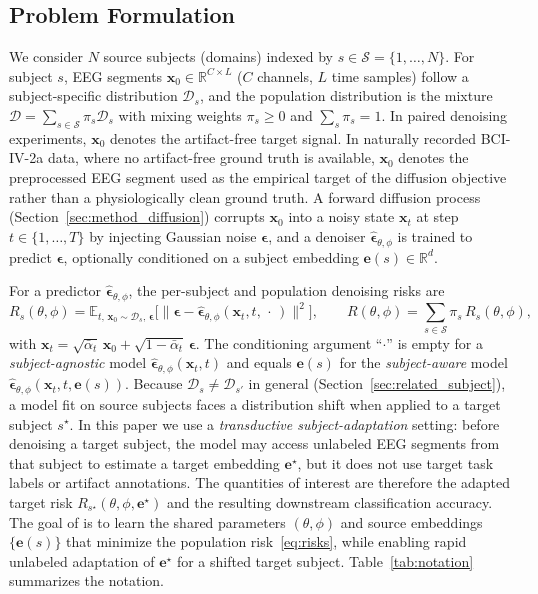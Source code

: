 \subsection{Problem Formulation}
\label{sec:method_problem}

We consider $N$ source subjects (domains) indexed by
$s\in\mathcal{S}=\{1,\dots,N\}$. For subject $s$, EEG segments $\mathbf{x}_0\in\mathbb{R}^{C\times L}$ ($C$ channels, $L$ time samples) follow a
subject-specific distribution $\mathcal{D}_s$, and the population distribution is the mixture $\mathcal{D}=\sum_{s\in\mathcal{S}}\pi_s\mathcal{D}_s$ with mixing weights $\pi_s\ge 0$ and $\sum_s\pi_s=1$. In paired denoising experiments,
$\mathbf{x}_0$ denotes the artifact-free target signal. In naturally recorded BCI-IV-2a data, where no artifact-free ground truth is available,
$\mathbf{x}_0$ denotes the preprocessed EEG segment used as the empirical target of the diffusion objective rather than a physiologically clean ground truth. A forward diffusion process (Section~\ref{sec:method_diffusion}) corrupts
$\mathbf{x}_0$ into a noisy state $\mathbf{x}_t$ at step $t\in\{1,\dots,T\}$ by injecting Gaussian noise $\boldsymbol{\epsilon}$, and a
denoiser $\widehat{\boldsymbol{\epsilon}}_{\theta,\phi}$ is trained to predict $\boldsymbol{\epsilon}$, optionally conditioned on a subject embedding
$\mathbf{e}(s)\in\mathbb{R}^{d}$.

For a predictor $\widehat{\boldsymbol{\epsilon}}_{\theta,\phi}$, the per-subject and population denoising risks are
\begin{equation}
  R_s(\theta,\phi)=\mathbb{E}_{t,\,\mathbf{x}_0\sim\mathcal{D}_s,\,\boldsymbol{\epsilon}}\big[\|\boldsymbol{\epsilon}-\widehat{\boldsymbol{\epsilon}}_{\theta,\phi}(\mathbf{x}_t,t,\,\cdot\,)\|^2\big],
  \qquad
  R(\theta,\phi)=\sum_{s\in\mathcal{S}}\pi_s\,R_s(\theta,\phi),
  \label{eq:risks}
\end{equation}
with $\mathbf{x}_t=\sqrt{\bar{\alpha}_t}\,\mathbf{x}_0+\sqrt{1-\bar{\alpha}_t}\,\boldsymbol{\epsilon}$.
The conditioning argument ``$\cdot$'' is empty for a \emph{subject-agnostic} model $\widehat{\boldsymbol{\epsilon}}_{\theta,\phi}(\mathbf{x}_t,t)$ and equals $\mathbf{e}(s)$ for the \emph{subject-aware} model
$\widehat{\boldsymbol{\epsilon}}_{\theta,\phi}(\mathbf{x}_t,t,\mathbf{e}(s))$. Because $\mathcal{D}_s\neq\mathcal{D}_{s'}$ in general (Section~\ref{sec:related_subject}), a model fit on source subjects faces a distribution shift when applied to a target subject $s^\star$. In this paper we use a \emph{transductive subject-adaptation} setting: before denoising a target
subject, the model may access unlabeled EEG segments from that subject to estimate a target embedding $\mathbf{e}^\star$, but it does not use target task labels or artifact annotations. The quantities of interest are therefore the adapted target risk $R_{s^\star}(\theta,\phi,\mathbf{e}^\star)$ and the resulting downstream classification accuracy. The goal of \saddpm{} is to learn the shared parameters $(\theta,\phi)$ and source embeddings $\{\mathbf{e}(s)\}$ that minimize the population risk~\eqref{eq:risks}, while enabling rapid unlabeled adaptation of $\mathbf{e}^\star$ for a shifted target subject. Table~\ref{tab:notation}
summarizes the notation.

